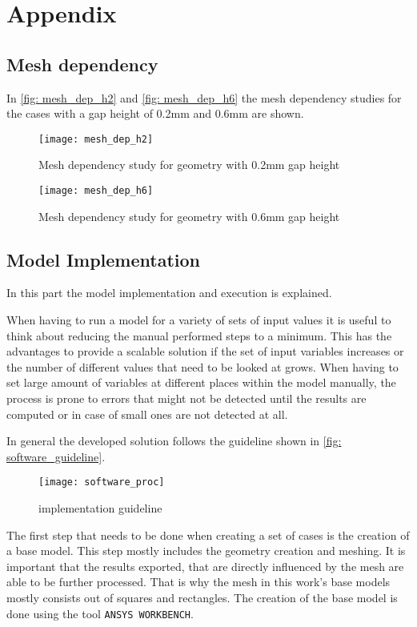 \documentclass[../thesis.tex]{subfiles}
\begin{document}
\chapter{Appendix}


\section{Mesh dependency}

In \autoref{fig: mesh_dep_h2} and \autoref{fig: mesh_dep_h6} the mesh dependency studies for the cases with a gap height of 0.2mm and 0.6mm are shown.
\begin{figure}[htb]
	\centering
	\texttt{[image: mesh\_dep\_h2]}
	\caption{Mesh dependency study for geometry with 0.2mm gap height}
	\label{fig: mesh_dep_h2}
\end{figure}

\begin{figure}[htb]
	\centering
	\texttt{[image: mesh\_dep\_h6]}
	\caption{Mesh dependency study for geometry with 0.6mm gap height}
	\label{fig: mesh_dep_h6}
\end{figure}

\section{Model Implementation}

In this part the model implementation and execution is explained.

When having to run a model for a variety of sets of input values it is useful to think about reducing the manual performed steps to a minimum. This has the advantages to provide a scalable solution if the set of input variables increases or the number of different values that need to be looked at grows. When having to set large amount of variables at different places within the model manually, the process is prone to errors that might not be detected until the results are computed or in case of small ones are not detected at all.

In general the developed solution follows the guideline shown in \autoref{fig: software_guideline}.

\begin{figure}[htbp]
	\centering
	\texttt{[image: software\_proc]}
	\caption{implementation guideline}
	\label{fig: software_guideline}
\end{figure}

The first step that needs to be done when creating a set of cases is the creation of a base model. This step mostly includes the geometry creation and meshing. It is important that the results exported, that are directly influenced by the mesh are able to be further processed. That is why the mesh in this work's base models mostly consists out of squares and rectangles. The creation of the base model is done using the tool \texttt{ANSYS WORKBENCH}.
\end{document}
